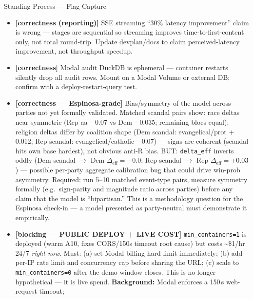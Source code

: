 \documentclass[11pt]{article}
\begin{document}
\begin{taskbox}{Standing Process --- Flag Capture}
{\begin{itemize}[leftmargin=1.6em, itemsep=1pt]
      juxtaposition: model answers a counterfactual-conditional question,
      market answers an unconditional-current question --- UI must label
      them as different, and must flag when the matched contract is the
      generic election market (not event-conditioned). Confirm framing with
      Espinosa.
    \item[$\square$] \textbf{[correctness (reporting)]} SSE streaming
      ``30\% latency improvement'' claim is wrong --- stages are sequential
      so streaming improves time-to-first-content only, not total
      round-trip. Update devplan/docs to claim perceived-latency
      improvement, not throughput speedup.
    \item[$\square$] \textbf{[correctness]} Modal audit DuckDB is
      ephemeral --- container restarts silently drop all audit rows.
      Mount on a Modal Volume or external DB; confirm with a
      deploy-restart-query test.
    \item[$\square$] \textbf{[correctness --- Espinosa-grade]} Bias/symmetry
      of the model across parties not yet formally validated. Matched
      scandal pairs show: race deltas near-symmetric (Rep aa $-$0.07 vs
      Dem $-$0.035; remaining blocs equal); religion deltas differ by
      coalition shape (Dem scandal: evangelical/prot $+$0.012; Rep scandal:
      evangelical/catholic $-$0.07) --- signs are coherent (scandal hits
      own base hardest), not obvious anti-R bias. BUT: \texttt{delta\_eff}
      inverts oddly (Dem scandal $\to$ Dem $\Delta_\text{eff}=-0.0$; Rep
      scandal $\to$ Rep $\Delta_\text{eff}=+0.03$) --- possible per-party
      aggregate calibration bug that could drive win-prob asymmetry.
      Required: run 5--10 matched event-type pairs, measure symmetry
      formally (e.g.\ sign-parity and magnitude ratio across parties)
      before any claim that the model is ``bipartisan.'' This is a
      methodology question for the Espinosa check-in --- a model presented
      as party-neutral must demonstrate it empirically.
    \item[$\square$] \textbf{[blocking --- PUBLIC DEPLOY + LIVE COST]}
      \texttt{min\_containers=1} is deployed (warm A10, fixes CORS/150s
      timeout root cause) but costs \textasciitilde\$1/hr 24/7
      \emph{right now}. Must: (a) set Modal billing hard limit immediately;
      (b) add per-IP rate limit and concurrency cap before sharing the URL;
      (c) scale to \texttt{min\_containers=0} after the demo window closes.
      This is no longer hypothetical --- it is live spend.
      \textbf{Background:} Modal enforces a 150\,s web-request timeout;

\end{itemize}}
\end{taskbox}
\end{document}

